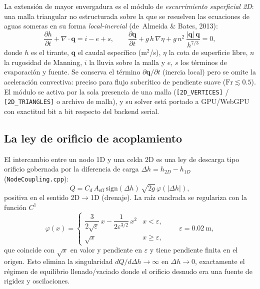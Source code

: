 \documentclass[11pt,a4paper]{article}
\begin{document}
La extensión de mayor envergadura es el módulo de \emph{escurrimiento
superficial 2D}: una malla triangular no estructurada sobre la que se resuelven
las ecuaciones de aguas someras en su forma \emph{local-inercial}
(de~Almeida \& Bates, 2013):
\begin{equation}
  \frac{\partial h}{\partial t} + \nabla\cdot \mathbf{q} = i - e + s,
  \qquad
  \frac{\partial \mathbf{q}}{\partial t} + g\,h\,\nabla\eta +
  g\,n^{2}\,\frac{\lvert\mathbf{q}\rvert\,\mathbf{q}}{h^{7/3}} = 0,
\end{equation}
donde $h$ es el tirante, $\mathbf{q}$ el caudal específico (m$^2$/s),
$\eta$ la cota de superficie libre, $n$ la rugosidad de Manning, $i$ la lluvia
sobre la malla y $e$, $s$ los términos de evaporación y fuente. Se conserva el
término $\partial \mathbf{q}/\partial t$ (inercia local) pero se omite la
aceleración convectiva: preciso para flujo subcrítico de pendiente suave
($\mathrm{Fr} \lesssim 0.5$). El módulo se activa por la sola presencia de una
malla (\texttt{[2D\_VERTICES]} / \texttt{[2D\_TRIANGLES]} o archivo de malla),
y su solver está portado a GPU/WebGPU con exactitud bit a bit respecto del
backend serial.

\subsection{La ley de orificio de acoplamiento}

El intercambio entre un nodo 1D y una celda 2D es una ley de descarga tipo
orificio gobernada por la diferencia de carga $\Delta h = h_{2D} - h_{1D}$
(\texttt{NodeCoupling.cpp}):
\begin{equation}
  Q = C_d\,A_{\mathrm{eff}}\,\mathrm{sign}(\Delta h)\,\sqrt{2g}\,
      \varphi(\lvert\Delta h\rvert),
\end{equation}
positiva en el sentido 2D$\to$1D (drenaje). La raíz cuadrada se regulariza
con la función $C^1$
\begin{equation}
  \varphi(x) = \begin{cases}
    \dfrac{3}{2\sqrt{\varepsilon}}\,x - \dfrac{1}{2\varepsilon^{3/2}}\,x^{2}
      & x < \varepsilon,\\[1em]
    \sqrt{x} & x \ge \varepsilon,
  \end{cases}
  \qquad \varepsilon = 0.02\ \mathrm{m},
\end{equation}
que coincide con $\sqrt{x}$ en valor y pendiente en $\varepsilon$ y tiene
pendiente finita en el origen. Esto elimina la singularidad
$dQ/d\Delta h \to \infty$ en $\Delta h \to 0$, exactamente el régimen de
equilibrio llenado/vaciado donde el orificio desnudo era una fuente de
rigidez y oscilaciones.
\end{document}

